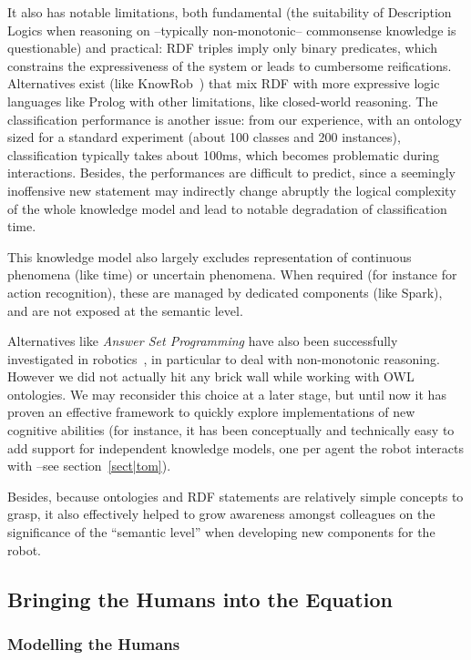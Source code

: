 \documentclass[preprint,3p,times]{elsarticle}
\begin{document}
It also has notable limitations, both fundamental (the suitability of
Description Logics when reasoning on --typically non-monotonic-- commonsense
knowledge is questionable) and practical: RDF triples imply only binary
predicates, which constrains the expressiveness of the system or leads to
cumbersome reifications. Alternatives exist (like {\sc
KnowRob}~\cite{Tenorth2009a}) that mix RDF with more expressive logic languages
like {\sc Prolog} with other limitations, like closed-world reasoning. The
classification performance is another issue: from our experience, with an
ontology sized for a standard experiment (about 100 classes and 200 instances),
classification typically takes about 100ms, which becomes problematic during
interactions.  Besides, the performances are difficult to predict, since a
seemingly inoffensive new statement may indirectly change abruptly the logical
complexity of the whole knowledge model and lead to notable degradation of
classification time.

This knowledge model also largely excludes representation of continuous
phenomena (like time) or uncertain phenomena. When required (for instance for
action recognition), these are managed by dedicated components (like {\sc
Spark}), and are not exposed at the semantic level.

Alternatives like \emph{Answer Set Programming} have also been
successfully investigated in robotics~\cite{Chen2010,Erdem2012}, in particular
to deal with non-monotonic reasoning. However we did not actually hit any brick wall
while working with OWL ontologies. We may reconsider this choice at a later
stage, but until now it has proven an effective framework to quickly explore
implementations of new cognitive abilities (for instance, it has been
conceptually and technically easy to add support for independent knowledge
models, one per agent the robot interacts with --see section~\ref{sect|tom}).

Besides, because ontologies and RDF statements are relatively simple concepts
to grasp, it also effectively helped to grow awareness amongst colleagues on
the significance of the ``semantic level'' when developing new components for
the robot.


\subsection{Bringing the Humans into the Equation}

\subsubsection{Modelling the Humans}
\end{document}
